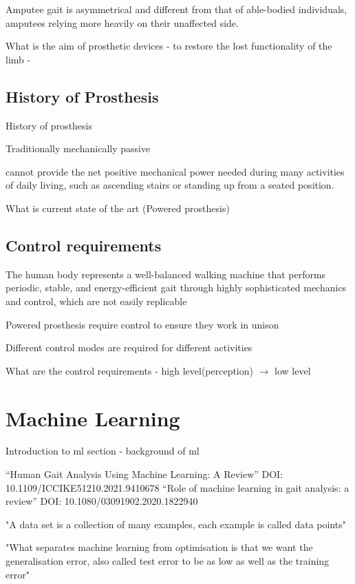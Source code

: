 Amputee gait is asymmetrical and different from that of able-bodied individuals, amputees relying more heavily on their unaffected side.\cite{Bateni2002, Varrecchia2019}

What is the aim of prosthetic devices - to restore the lost functionality of the limb - \cite{Tucker2015}

\subsection{History of Prosthesis}
History of prosthesis

Traditionally mechanically passive

cannot provide the net positive mechanical power needed during many activities of daily living, such as ascending stairs or standing up from a seated position\cite{Simon2013}.

What is current state of the art (Powered prosthesis)


\subsection{Control requirements} %
The human body represents a well-balanced walking machine that performs periodic, stable, and energy-efficient gait through highly sophisticated mechanics and control, which are not easily replicable\cite{Mummolo2013}

Powered prosthesis require control to ensure they work in unison

Different control modes are required for different activities\cite{Simon2013}

What are the control requirements - high level(perception) $\rightarrow$ low level\cite{Tucker2015}


\section{Machine Learning}
Introduction to \acrfull{ml} section - background of \acrshort{ml}


``Human Gait Analysis Using Machine Learning: A Review'' DOI: 10.1109/ICCIKE51210.2021.9410678
``Role of machine learning in gait analysis: a review'' DOI: 10.1080/03091902.2020.1822940

"A data set is a collection of many examples, each example is called data points"

"What separates machine learning from optimisation is that we want the generalisation error, also called test error to be as low as well as the training error"\cite{Goodfellow2015}

